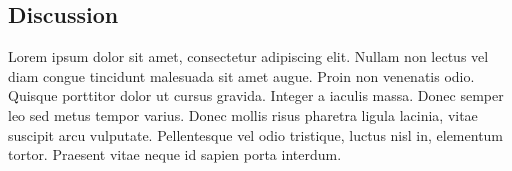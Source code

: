 \documentclass[a0,landscape]{a0poster}
\newcommand{\secmoveup}{\vspace{-1cm}}
\begin{document}
\begin{multicols}{3}
\secmoveup
\section{Discussion}
Lorem ipsum dolor sit amet, consectetur adipiscing elit. Nullam non lectus vel diam congue tincidunt malesuada sit amet augue. Proin non venenatis odio. Quisque porttitor dolor ut cursus gravida. Integer a iaculis massa. Donec semper leo sed metus tempor varius. Donec mollis risus pharetra ligula lacinia, vitae suscipit arcu vulputate. Pellentesque vel odio tristique, luctus nisl in, elementum tortor. Praesent vitae neque id sapien porta interdum.



%




\end{multicols}
\end{document}
